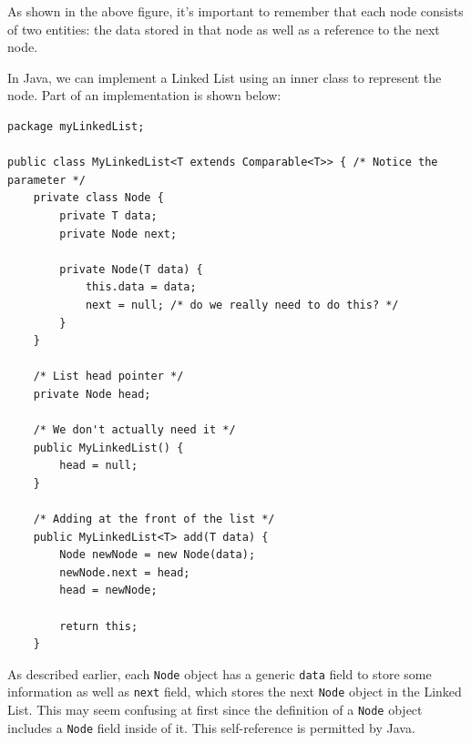 As shown in the above figure, it's important to remember that each node consists of two entities: the data stored in that node as well as a reference to the next node. 

In Java, we can implement a Linked List using an inner class to represent the node. Part of an implementation is shown below:

\begin{lstlisting}
package myLinkedList;

public class MyLinkedList<T extends Comparable<T>> { /* Notice the parameter */
	private class Node {
		private T data;
		private Node next;

		private Node(T data) {
			this.data = data;
			next = null; /* do we really need to do this? */
		}
	}

	/* List head pointer */
	private Node head;

	/* We don't actually need it */
	public MyLinkedList() {
		head = null;
	}

	/* Adding at the front of the list */
	public MyLinkedList<T> add(T data) {
		Node newNode = new Node(data);
		newNode.next = head;
		head = newNode;

		return this;
	}
\end{lstlisting}

As described earlier, each \verb!Node! object has a generic \verb!data! field to store some information as well as \verb!next! field, which stores the next \verb!Node! object in the Linked List. This may seem confusing at first since the definition of a \verb!Node! object includes a \verb!Node! field inside of it. This self-reference is permitted by Java. 